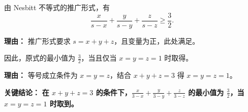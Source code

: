 \begin{examplebox}
\begin{description}[style=nextline, leftmargin=2.8em, labelsep=0.5em, itemsep=0.45em]
    \item[\textbf{第三步（应用推广形式）：}] 由 Nesbitt 不等式的推广形式，有
    \[
    \frac{x}{s-x} + \frac{y}{s-y} + \frac{z}{s-z} \ge \frac{3}{2}.
    \]
    \par\textbf{理由：}
    推广形式要求 $s=x+y+z$，且变量为正，此处满足。

    \item[\textbf{第四步（得出最小值）：}] 因此，原式的最小值为 $\frac{3}{2}$，当且仅当 $x=y=z=1$ 时取得。
    \par\textbf{理由：}
    等号成立条件为 $x=y=z$，结合 $x+y+z=3$ 得 $x=y=z=1$。
\end{description}

\textbf{\textcolor{CExample}{关键结论：}} \textbf{在 $x+y+z=3$ 的条件下，$\frac{x}{3-x} + \frac{y}{3-y} + \frac{z}{3-z}$ 的最小值为 $\frac{3}{2}$，当 $x=y=z=1$ 时取到。}
\end{examplebox}

